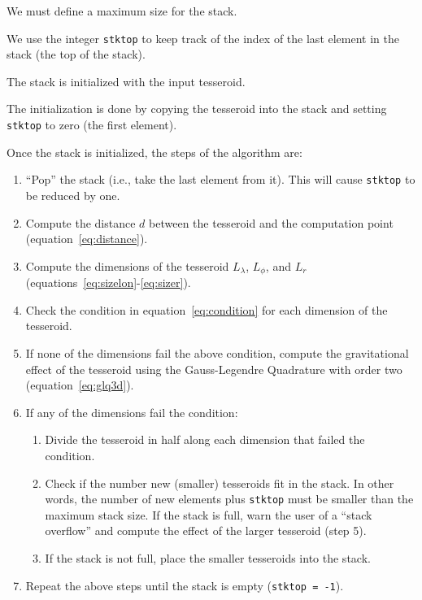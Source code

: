 \documentclass[paper,twocolumn]{geophysics}
\begin{document}
We must define a maximum size for the stack.

We use the integer \texttt{stktop} to keep track of the index of the last
element in the stack (the top of the stack).

The stack is initialized with the input tesseroid.

The initialization is done by copying the tesseroid into the stack and
setting \texttt{stktop} to zero (the first element).

Once the stack is initialized, the steps of the algorithm are:

\begin{enumerate}
    \item ``Pop'' the stack (i.e., take the last element from it).
        This will cause \texttt{stktop} to be reduced by one.
    \item Compute the distance $d$ between the tesseroid and
        the computation point (equation~\ref{eq:distance}).
    \item Compute the dimensions of the tesseroid $L_\lambda$, $L_\phi$,
        and $L_r$ (equations~\ref{eq:sizelon}-\ref{eq:sizer}).
    \item Check the condition in equation~\ref{eq:condition} for each
        dimension of the tesseroid.
    \item If none of the dimensions fail the above condition,
        compute the gravitational effect of the tesseroid using the
        Gauss-Legendre Quadrature with order two
        (equation~\ref{eq:glq3d}).
    \item If any of the dimensions fail the condition:
    \begin{enumerate}
        \item Divide the tesseroid in half along each dimension that failed
             the condition.
        \item Check if the number new (smaller) tesseroids fit in the stack.
             In other words, the number of new elements plus \texttt{stktop}
             must be smaller than the maximum stack size.
             If the stack is full, warn the user of a ``stack overflow''
             and compute the effect of the larger tesseroid (step 5).
        \item If the stack is not full, place the smaller tesseroids into
             the stack.
    \end{enumerate}
    \item Repeat the above steps until the stack is empty
        (\texttt{stktop = -1}).
\end{enumerate}
\end{document}
